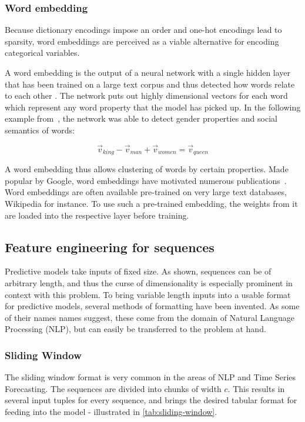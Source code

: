 \subsubsection*{Word embedding}
Because dictionary encodings impose an order and one-hot encodings lead to sparsity, word embeddings are perceived as a viable alternative for encoding categorical variables.

A word embedding is the output of a neural network with a single hidden layer that has been trained on a large text corpus and thus detected how words relate to each other \cite{web:word-embedding}. The network puts out highly dimensional vectors for each word which represent any word property that the model has picked up. In the following example from~\cite{web:word-embedding}, the network was able to detect gender properties and social semantics of words:

$$
\vec{v}_{king} - \vec{v}_{man} + \vec{v}_{women} = \vec{v}_{queen}
$$

A word embedding thus allows clustering of words by certain properties. Made popular by Google, word embeddings have motivated numerous publications~\cite{web:ahogrammer, goldberg2014word2vec}. Word embeddings are often available pre-trained on very large text databases, Wikipedia for instance. To use such a pre-trained embedding, the weights from it are  loaded into the respective layer before training.

\subsection{Feature engineering for sequences}
\label{sec:sequential-feature-engineering}
Predictive models take inputs of fixed size. As shown, sequences can be of arbitrary length, and thus the curse of dimensionality is especially prominent in context with this problem. To bring variable length inputs into a usable format for predictive models, several methods of formatting have been invented. As some of their names names suggest, these come from the domain of Natural Language Processing (NLP), but can easily be transferred to the problem at hand.

\subsubsection*{Sliding Window}
The sliding window format is very common in the areas of NLP and Time Series Forecasting. The sequences are divided into chunks of width $c$. This results in several input tuples for every sequence, and brings the desired tabular format for feeding into the model - illustrated in \autoref{tab:sliding-window}.

